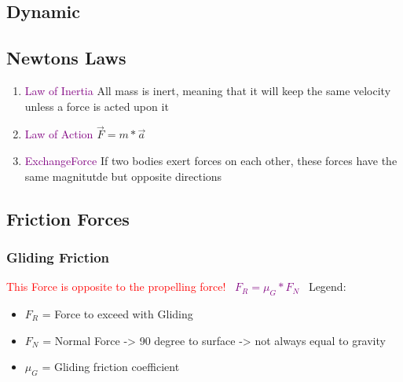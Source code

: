 \documentclass[main.tex,fontsize=8pt,paper=a4,paper=portrait,DIV=calc,]{scrartcl}
\begin{document}
\begin{multicols*}{2}
\section{Dynamic}

\subsection{Newtons Laws}
\begin{enumerate}
\item \textcolor{purple}{Law of Inertia}\newline 
All mass is inert, meaning that it will keep the same velocity unless a force is acted upon it
\item \textcolor{purple}{Law of Action}\newline
  \(\vec{F} = m * \vec{a}\)
\item \textcolor{purple}{ExchangeForce}\newline
  If two bodies exert forces on each other, these forces have the same magnitutde but opposite directions
\end{enumerate} 

\subsection{Friction Forces}
\subsubsection{Gliding Friction}
\textcolor{red}{This Force is opposite to the propelling force!}\newline
\, \newline
\large \textcolor{purple}{\( F_R = \mu_G * F_N \)}\newline
\, \newline
\normalsize Legend: \newline
\begin{itemize}
\item \(F_R\) = Force to exceed with Gliding
\item \(F_N\) = Normal Force -> 90 degree to surface -> not always equal to gravity
\item \(\mu_G\) = Gliding friction coefficient
\end{itemize} 


\end{multicols*}
\end{document}
